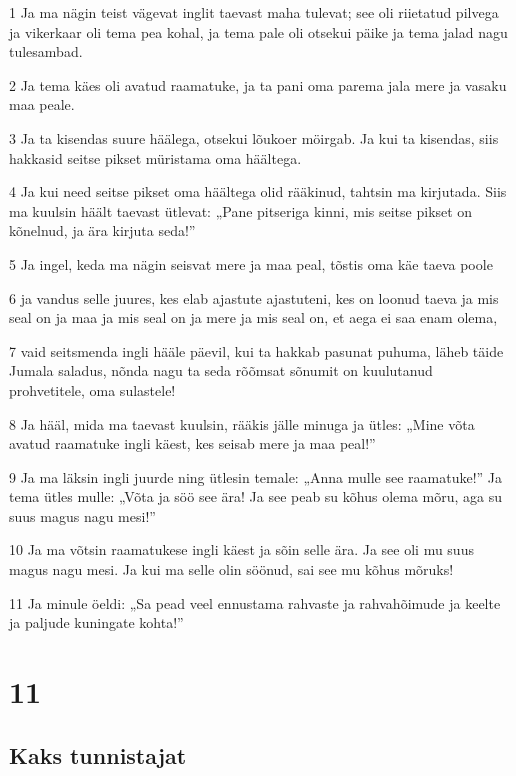 \par 1 Ja ma nägin teist vägevat inglit taevast maha tulevat; see oli riietatud pilvega ja vikerkaar oli tema pea kohal, ja tema pale oli otsekui päike ja tema jalad nagu tulesambad.
\par 2 Ja tema käes oli avatud raamatuke, ja ta pani oma parema jala mere ja vasaku maa peale.
\par 3 Ja ta kisendas suure häälega, otsekui lõukoer möirgab. Ja kui ta kisendas, siis hakkasid seitse pikset müristama oma häältega.
\par 4 Ja kui need seitse pikset oma häältega olid rääkinud, tahtsin ma kirjutada. Siis ma kuulsin häält taevast ütlevat: „Pane pitseriga kinni, mis seitse pikset on kõnelnud, ja ära kirjuta seda!”
\par 5 Ja ingel, keda ma nägin seisvat mere ja maa peal, tõstis oma käe taeva poole
\par 6 ja vandus selle juures, kes elab ajastute ajastuteni, kes on loonud taeva ja mis seal on ja maa ja mis seal on ja mere ja mis seal on, et aega ei saa enam olema,
\par 7 vaid seitsmenda ingli hääle päevil, kui ta hakkab pasunat puhuma, läheb täide Jumala saladus, nõnda nagu ta seda rõõmsat sõnumit on kuulutanud prohvetitele, oma sulastele!
\par 8 Ja hääl, mida ma taevast kuulsin, rääkis jälle minuga ja ütles: „Mine võta avatud raamatuke ingli käest, kes seisab mere ja maa peal!”
\par 9 Ja ma läksin ingli juurde ning ütlesin temale: „Anna mulle see raamatuke!” Ja tema ütles mulle: „Võta ja söö see ära! Ja see peab su kõhus olema mõru, aga su suus magus nagu mesi!”
\par 10 Ja ma võtsin raamatukese ingli käest ja sõin selle ära. Ja see oli mu suus magus nagu mesi. Ja kui ma selle olin söönud, sai see mu kõhus mõruks!
\par 11 Ja minule öeldi: „Sa pead veel ennustama rahvaste ja rahvahõimude ja keelte ja paljude kuningate kohta!”


\chapter{11}

\section*{Kaks tunnistajat}

